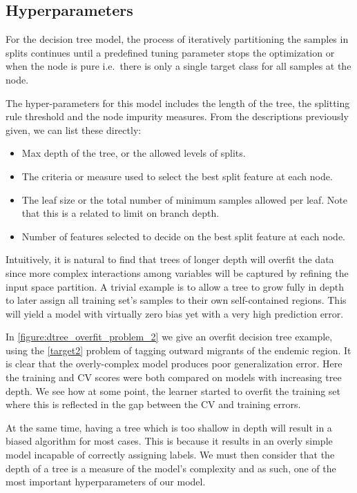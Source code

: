 \subsection{Hyperparameters}\label{subsection:decision_trees_hyperparameters}

For the decision tree model, the process of iteratively partitioning the samples in splits continues until a predefined tuning parameter stops the optimization or when the node is pure i.e.\ there is only a single target class for all samples at the node.

The hyper-parameters for this model includes the length of the tree, the splitting rule threshold and the node impurity measures.
From the descriptions previously given, we can list these directly:

\begin{itemize}
\item Max depth of the tree, or the allowed levels of splits.
\item The criteria or measure used to select the best split feature at each node.
\item The leaf size or the total number of minimum samples allowed per leaf.
Note that this is a related to limit on branch depth.
\item Number of features selected to decide on the best split feature at each node.
\end{itemize}


Intuitively, it is natural to find that trees of longer depth will overfit the data since more complex interactions among variables will be captured by refining the input space partition.
A trivial example is to allow a tree to grow fully in depth to later assign all training set's samples to their own self-contained regions.
This will yield a model with virtually zero bias yet with a very high prediction error.

In \cref{figure:dtree_overfit_problem_2} we give an overfit decision tree example, using the  \cref{target2} problem of tagging outward migrants of the endemic region.
It is clear that the overly-complex model produces poor generalization error.
Here the training and CV scores were both compared on models with increasing tree depth.
We see how at some point, the learner started to overfit the training set where this is reflected in the gap between the CV and training errors.

At the same time, having a tree which is too shallow in depth will result in a biased algorithm  for most cases.
This is because it results in an overly simple model incapable of correctly assigning labels.
We must then consider that the depth of a tree is a measure of the model's complexity and as such, one of the most important hyperparameters of our model.

